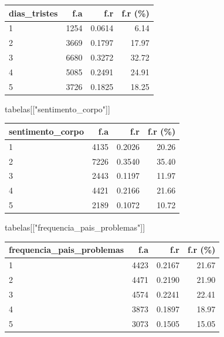 \documentclass[
]{article}
\newenvironment{Shaded}{\begin{snugshade}}{\end{snugshade}}
\newcommand{\NormalTok}[1]{\textcolor[rgb]{0.00,0.23,0.31}{#1}}
\newcommand{\StringTok}[1]{\textcolor[rgb]{0.13,0.47,0.30}{#1}}
\begin{document}
\begin{longtable}[]{@{}lrrr@{}}
\toprule()
dias\_tristes & f.a & f.r & f.r (\%) \\
\midrule()
\endhead
1 & 1254 & 0.0614 & 6.14 \\
2 & 3669 & 0.1797 & 17.97 \\
3 & 6680 & 0.3272 & 32.72 \\
4 & 5085 & 0.2491 & 24.91 \\
5 & 3726 & 0.1825 & 18.25 \\
\bottomrule()
\end{longtable}

\begin{Shaded}
\begin{Highlighting}[]
\NormalTok{tabelas[[}\StringTok{"sentimento\_corpo"}\NormalTok{]]}
\end{Highlighting}
\end{Shaded}

\begin{longtable}[]{@{}lrrr@{}}
\toprule()
sentimento\_corpo & f.a & f.r & f.r (\%) \\
\midrule()
\endhead
1 & 4135 & 0.2026 & 20.26 \\
2 & 7226 & 0.3540 & 35.40 \\
3 & 2443 & 0.1197 & 11.97 \\
4 & 4421 & 0.2166 & 21.66 \\
5 & 2189 & 0.1072 & 10.72 \\
\bottomrule()
\end{longtable}

\begin{Shaded}
\begin{Highlighting}[]
\NormalTok{tabelas[[}\StringTok{"frequencia\_pais\_problemas"}\NormalTok{]]}
\end{Highlighting}
\end{Shaded}

\begin{longtable}[]{@{}lrrr@{}}
\toprule()
frequencia\_pais\_problemas & f.a & f.r & f.r (\%) \\
\midrule()
\endhead
1 & 4423 & 0.2167 & 21.67 \\
2 & 4471 & 0.2190 & 21.90 \\
3 & 4574 & 0.2241 & 22.41 \\
4 & 3873 & 0.1897 & 18.97 \\
5 & 3073 & 0.1505 & 15.05 \\
\bottomrule()
\end{longtable}
\end{document}
